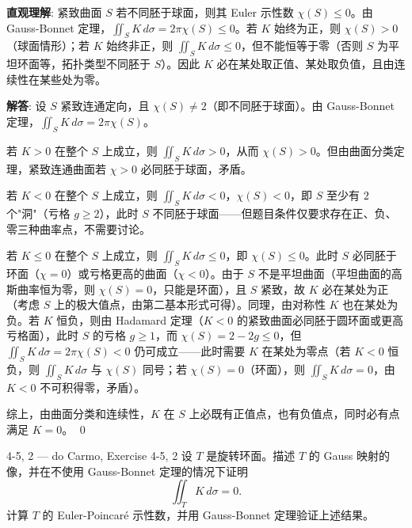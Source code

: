 \begin{solution}
\textbf{直观理解}: 紧致曲面 $S$ 若不同胚于球面，则其 Euler 示性数 $\chi(S) \leq 0$。由 Gauss-Bonnet 定理，$\iint_S K\, d\sigma = 2\pi\chi(S) \leq 0$。若 $K$ 始终为正，则 $\chi(S) > 0$（球面情形）；若 $K$ 始终非正，则 $\iint_S K\, d\sigma \leq 0$，但不能恒等于零（否则 $S$ 为平坦环面等，拓扑类型不同胚于 $S$）。因此 $K$ 必在某处取正值、某处取负值，且由连续性在某些处为零。

\textbf{解答}: 设 $S$ 紧致连通定向，且 $\chi(S) \neq 2$（即不同胚于球面）。由 Gauss-Bonnet 定理，$\iint_S K\, d\sigma = 2\pi\chi(S)$。

若 $K > 0$ 在整个 $S$ 上成立，则 $\iint_S K\, d\sigma > 0$，从而 $\chi(S) > 0$。但由曲面分类定理，紧致连通曲面若 $\chi > 0$ 必同胚于球面，矛盾。

若 $K < 0$ 在整个 $S$ 上成立，则 $\iint_S K\, d\sigma < 0$，$\chi(S) < 0$，即 $S$ 至少有 $2$ 个"洞"（亏格 $g \geq 2$），此时 $S$ 不同胚于球面——但题目条件仅要求存在正、负、零三种曲率点，不需要讨论。

若 $K \leq 0$ 在整个 $S$ 上成立，则 $\iint_S K\, d\sigma \leq 0$，即 $\chi(S) \leq 0$。此时 $S$ 必同胚于环面（$\chi=0$）或亏格更高的曲面（$\chi<0$）。由于 $S$ 不是平坦曲面（平坦曲面的高斯曲率恒为零，则 $\chi(S)=0$，只能是环面），且 $S$ 紧致，故 $K$ 必在某处为正（考虑 $S$ 上的极大值点，由第二基本形式可得）。同理，由对称性 $K$ 也在某处为负。若 $K$ 恒负，则由 Hadamard 定理（$K<0$ 的紧致曲面必同胚于圆环面或更高亏格面），此时 $S$ 的亏格 $g \geq 1$，而 $\chi(S)=2-2g \leq 0$，但 $\iint_S K\, d\sigma = 2\pi\chi(S) < 0$ 仍可成立——此时需要 $K$ 在某处为零点（若 $K<0$ 恒负，则 $\iint_S K\, d\sigma$ 与 $\chi(S)$ 同号；若 $\chi(S)=0$（环面），则 $\iint_S K\, d\sigma=0$，由 $K<0$ 不可积得零，矛盾）。

综上，由曲面分类和连续性，$K$ 在 $S$ 上必既有正值点，也有负值点，同时必有点满足 $K=0$。
\qed
\end{solution}

\begin{exercise}{4-5, 2 — do Carmo, Exercise 4-5, 2}
设 $T$ 是旋转环面。描述 $T$ 的 Gauss 映射的像，并在不使用 Gauss-Bonnet 定理的情况下证明
\[
\iint_T K\, d\sigma = 0.
\]
计算 $T$ 的 Euler-Poincaré 示性数，并用 Gauss-Bonnet 定理验证上述结果。
\end{exercise}

